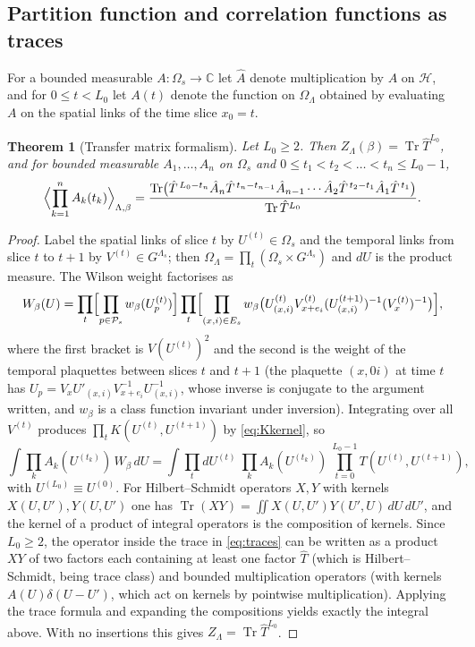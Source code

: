 \documentclass[11pt,a4paper]{article}
\newtheorem{theorem}{Theorem}[section]
\theoremstyle{definition}
\theoremstyle{remark}
\DeclareMathOperator{\Tr}{Tr}
\newcommand{\C}{\mathbb{C}}
\newcommand{\cH}{\mathcal{H}}
\newcommand{\cP}{\mathcal{P}}
\newcommand{\hT}{\hat{T}}
\newcommand{\hA}{\hat{A}}
\newcommand{\dU}{\,dU}
\begin{document}
\subsection{Partition function and correlation functions as traces}

For a bounded measurable $A:\Omega_s\to\C$ let $\hA$ denote multiplication by $A$ on $\cH$, and for $0\le t<L_0$
let $A(t)$ denote the function on $\Omega_\Lambda$ obtained by evaluating $A$ on the spatial links of the time slice
$x_0=t$.

\begin{theorem}[Transfer matrix formalism]\label{thm:tm}
Let $L_0\ge2$. Then $Z_\Lambda(\beta)=\Tr\hT^{L_0}$, and for bounded measurable $A_1,\dots,A_n$ on $\Omega_s$ and
$0\le t_1<t_2<\dots<t_n\le L_0-1$,
\begin{equation}\label{eq:traces}
\Bigl\langle\prod_{k=1}^nA_k(t_k)\Bigr\rangle_{\Lambda,\beta}
=\frac{\Tr\bigl(\hT^{\,L_0-t_n}\hA_n\hT^{\,t_n-t_{n-1}}\hA_{n-1}\cdots\hA_2\hT^{\,t_2-t_1}\hA_1\hT^{\,t_1}\bigr)}{\Tr\hT^{L_0}} .
\end{equation}
\end{theorem}

\begin{proof}
Label the spatial links of slice $t$ by $U^{(t)}\in\Omega_s$ and the temporal links from slice $t$ to $t+1$ by
$V^{(t)}\in G^{\Lambda_s}$; then $\Omega_\Lambda=\prod_t(\Omega_s\times G^{\Lambda_s})$ and $dU$ is the product measure.
The Wilson weight factorises as
\[
W_\beta(U)=\prod_{t}\Bigl[\prod_{p\in\cP_s}w_\beta(U^{(t)}_p)\Bigr]\prod_t\Bigl[\prod_{(x,i)\in E_s}
w_\beta\bigl(U^{(t)}_{(x,i)}V^{(t)}_{x+e_i}(U^{(t+1)}_{(x,i)})^{-1}(V^{(t)}_x)^{-1}\bigr)\Bigr],
\]
where the first bracket is $V(U^{(t)})^2$ and the second is the weight of the temporal plaquettes between slices $t$
and $t+1$ (the plaquette $(x,0i)$ at time $t$ has $U_p=V_xU'_{(x,i)}V_{x+e_i}^{-1}U_{(x,i)}^{-1}$, whose inverse is
conjugate to the argument written, and $w_\beta$ is a class function invariant under inversion). Integrating over all
$V^{(t)}$ produces $\prod_tK(U^{(t)},U^{(t+1)})$ by \eqref{eq:Kkernel}, so
\[
\int\prod_kA_k(U^{(t_k)})\,W_\beta\dU
=\int\prod_{t}dU^{(t)}\ \prod_kA_k(U^{(t_k)})\ \prod_{t=0}^{L_0-1}T(U^{(t)},U^{(t+1)}),
\]
with $U^{(L_0)}\equiv U^{(0)}$.
For Hilbert--Schmidt operators $X,Y$ with kernels $X(U,U'),Y(U,U')$ one has $\Tr(XY)=\iint X(U,U')Y(U',U)\dU\dU'$, and the
kernel of a product of integral operators is the composition of kernels. Since $L_0\ge2$, the operator inside the trace
in \eqref{eq:traces} can be written as a product $XY$ of two factors each containing at least one factor $\hT$ (which
is Hilbert--Schmidt, being trace class) and bounded multiplication operators (with kernels $A(U)\delta(U-U')$, which act
on kernels by pointwise multiplication). Applying the trace formula and expanding the compositions yields exactly the
integral above. With no insertions this gives $Z_\Lambda=\Tr\hT^{L_0}$.
\end{proof}
\end{document}
